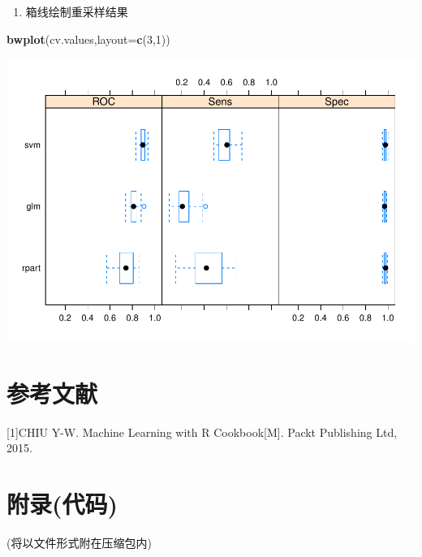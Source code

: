 \documentclass[
]{article}
\newenvironment{Shaded}{\begin{snugshade}}{\end{snugshade}}
\newcommand{\DataTypeTok}[1]{\textcolor[rgb]{0.13,0.29,0.53}{#1}}
\newcommand{\DecValTok}[1]{\textcolor[rgb]{0.00,0.00,0.81}{#1}}
\newcommand{\KeywordTok}[1]{\textcolor[rgb]{0.13,0.29,0.53}{\textbf{#1}}}
\newcommand{\NormalTok}[1]{#1}
\providecommand{\tightlist}{%
  \setlength{\itemsep}{0pt}\setlength{\parskip}{0pt}}
\begin{document}
\begin{enumerate}
\def\labelenumi{\arabic{enumi}.}
\setcounter{enumi}{3}
\tightlist
\item
  箱线绘制重采样结果
\end{enumerate}

\begin{Shaded}
\begin{Highlighting}[]
\KeywordTok{bwplot}\NormalTok{(cv.values,}\DataTypeTok{layout=}\KeywordTok{c}\NormalTok{(}\DecValTok{3}\NormalTok{,}\DecValTok{1}\NormalTok{))}
\end{Highlighting}
\end{Shaded}

\includegraphics{R_FinalReport_files/figure-latex/unnamed-chunk-51-1.pdf}

\hypertarget{ux53c2ux8003ux6587ux732e}{%
\section{参考文献}\label{ux53c2ux8003ux6587ux732e}}

{[}1{]}CHIU Y-W. Machine Learning with R Cookbook{[}M{]}. Packt
Publishing Ltd, 2015.

\hypertarget{ux9644ux5f55ux4ee3ux7801}{%
\section{附录(代码)}\label{ux9644ux5f55ux4ee3ux7801}}

(将以文件形式附在压缩包内)
\end{document}
